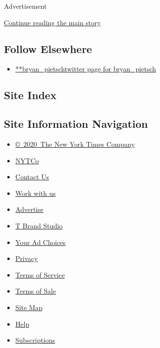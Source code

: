 Advertisement

\protect\hyperlink{after-mid2}{Continue reading the main story}

\hypertarget{follow-elsewhere}{%
\subsection{Follow Elsewhere}\label{follow-elsewhere}}

\begin{itemize}
\tightlist
\item
  \href{https://twitter.com/bryan_pietsch}{**bryan\_pietschtwitter page
  for bryan\_pietsch}
\end{itemize}

\hypertarget{site-index}{%
\subsection{Site Index}\label{site-index}}

\hypertarget{site-information-navigation}{%
\subsection{Site Information
Navigation}\label{site-information-navigation}}

\begin{itemize}
\tightlist
\item
  \href{https://help.nytimes.com/hc/en-us/articles/115014792127-Copyright-notice}{©~2020~The
  New York Times Company}
\end{itemize}

\begin{itemize}
\tightlist
\item
  \href{https://www.nytco.com/}{NYTCo}
\item
  \href{https://help.nytimes.com/hc/en-us/articles/115015385887-Contact-Us}{Contact
  Us}
\item
  \href{https://www.nytco.com/careers/}{Work with us}
\item
  \href{https://nytmediakit.com/}{Advertise}
\item
  \href{http://www.tbrandstudio.com/}{T Brand Studio}
\item
  \href{https://www.nytimes.com/privacy/cookie-policy\#how-do-i-manage-trackers}{Your
  Ad Choices}
\item
  \href{https://www.nytimes.com/privacy}{Privacy}
\item
  \href{https://help.nytimes.com/hc/en-us/articles/115014893428-Terms-of-service}{Terms
  of Service}
\item
  \href{https://help.nytimes.com/hc/en-us/articles/115014893968-Terms-of-sale}{Terms
  of Sale}
\item
  \href{https://spiderbites.nytimes.com}{Site Map}
\item
  \href{https://help.nytimes.com/hc/en-us}{Help}
\item
  \href{https://www.nytimes.com/subscription?campaignId=37WXW}{Subscriptions}
\end{itemize}
